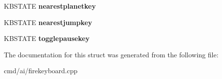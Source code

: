 \begin{DoxyCompactItemize}
\item 
K\+B\+S\+T\+A\+TE {\bfseries nearestplanetkey}\hypertarget{structFIREKEYBOARDTYPE_a9bc6cd5f8f9b61776f7f11e6f0bb881a}{}\label{structFIREKEYBOARDTYPE_a9bc6cd5f8f9b61776f7f11e6f0bb881a}

\item 
K\+B\+S\+T\+A\+TE {\bfseries nearestjumpkey}\hypertarget{structFIREKEYBOARDTYPE_a2482e86a86aded19450edd43dca243a6}{}\label{structFIREKEYBOARDTYPE_a2482e86a86aded19450edd43dca243a6}

\item 
K\+B\+S\+T\+A\+TE {\bfseries togglepausekey}\hypertarget{structFIREKEYBOARDTYPE_a9a778e7ca4f5ce5fa2ca15ece33340f0}{}\label{structFIREKEYBOARDTYPE_a9a778e7ca4f5ce5fa2ca15ece33340f0}

\end{DoxyCompactItemize}


The documentation for this struct was generated from the following file\+:\begin{DoxyCompactItemize}
\item 
cmd/ai/firekeyboard.\+cpp\end{DoxyCompactItemize}
